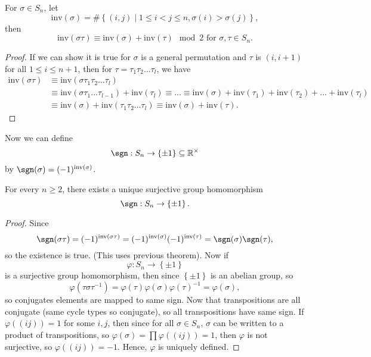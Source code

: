 \begin{theorem}
    For \(\sigma \in S_n\), let 
    \[
        \mathrm{inv}(\sigma ) = \# \left\{ (i, j) \mid 1 \le i < j \le n, \sigma (i) > \sigma (j) \right\},  
    \] then 
    \[
        \mathrm{inv}(\sigma \tau ) \equiv \mathrm{inv}(\sigma ) + \mathrm{inv}(\tau ) \mod{2} \text{ for } \sigma , \tau \in S_n.   
    \]
\end{theorem}
\begin{proof}
    If we can show it is true for \(\sigma \) is a general permutation and \(\tau \) is \((i, i+1)\) for all \(1 \le i \le n+1\), then for \(\tau = \tau _1 \tau _2 \dots \tau _l\), we have 
    \begin{align*}
        \mathrm{inv}(\sigma \tau ) &\equiv  \mathrm{inv}(\sigma \tau _1 \tau _2 \dots \tau _l) \\
        &\equiv  \mathrm{inv}(\sigma \tau _1 \dots \tau _{l-1}) + \mathrm{inv}(\tau _l) \equiv \dots \equiv \mathrm{inv}(\sigma ) + \mathrm{inv}(\tau _1) + \mathrm{inv}(\tau _2) + \dots + \mathrm{inv}(\tau _l) \\
        &\equiv \mathrm{inv}(\sigma ) + \mathrm{inv}(\tau _1 \tau _2 \dots \tau _l) \equiv \mathrm{inv}(\sigma ) + \mathrm{inv}(\tau ).          
    \end{align*}   
\end{proof}

Now we can define 
    \[
        \sgn : S_n \to \left\{ \pm 1 \right\} \subseteq \mathbb{R} ^{\times }
    \] by \(\sgn (\sigma ) = (-1)^{\mathrm{inv}(\sigma ) }\). 
    \begin{theorem}
        For every \(n \ge 2\), there exists a unique surjective group homomorphism 
        \[
            \sgn : S_n \to \left\{ \pm 1 \right\}. 
        \] 
    \end{theorem} 
    \begin{proof}
        Since 
        \[
            \sgn (\sigma \tau ) = (-1)^{\mathrm{inv}(\sigma \tau)  } = (-1)^{\mathrm{inv}(\sigma ) } (-1)^{\mathrm{inv}(\tau ) } = \sgn (\sigma ) \sgn (\tau ),
        \] so the existence is true. (This uses previous theorem). Now if 
        \[
            \varphi : S_n \to \left\{ \pm 1 \right\} 
        \] is a surjective group homomorphism, then since \(\left\{ \pm 1 \right\} \) is an abelian group, so 
        \[
            \varphi (\tau \sigma \tau ^{-1}) = \varphi (\tau ) \varphi (\sigma ) \varphi (\tau )^{-1} = \varphi (\sigma ),
        \] so conjugates elements are mapped to same sign. Now that transpositions are all conjugate (same cycle types so conjugate), so all transpositions have same sign. If \(\varphi ((ij)) = 1\) for some \(i, j\), then since for all \(\sigma \in S_n\), \(\sigma \) can be written to a product of transpositions, so \(\varphi (\sigma ) = \prod \varphi ((ij)) = 1\), then \(\varphi \) is not surjective, so \(\varphi ((ij)) = -1\). Hence, \(\varphi \) is uniquely defined.         
    \end{proof}

